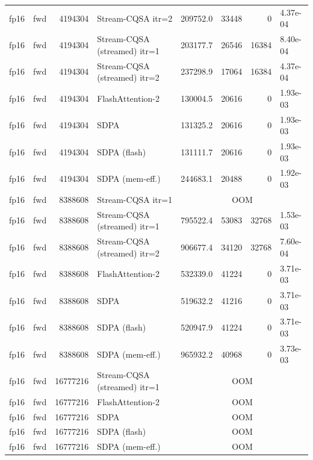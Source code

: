 \begin{tabular}{llrlrrrl}
fp16 & fwd & 4194304 & Stream-CQSA itr=2 & 209752.0 & 33448 & 0 & 4.37e-04 \\
fp16 & fwd & 4194304 & Stream-CQSA (streamed) itr=1 & 203177.7 & 26546 & 16384 & 8.40e-04 \\
fp16 & fwd & 4194304 & Stream-CQSA (streamed) itr=2 & 237298.9 & 17064 & 16384 & 4.37e-04 \\
fp16 & fwd & 4194304 & FlashAttention-2 & 130004.5 & 20616 & 0 & 1.93e-03 \\
fp16 & fwd & 4194304 & SDPA & 131325.2 & 20616 & 0 & 1.93e-03 \\
fp16 & fwd & 4194304 & SDPA (flash) & 131111.7 & 20616 & 0 & 1.93e-03 \\
fp16 & fwd & 4194304 & SDPA (mem-eff.) & 244683.1 & 20488 & 0 & 1.92e-03 \\
fp16 & fwd & 8388608 & Stream-CQSA itr=1 & \multicolumn{4}{c}{OOM} \\
fp16 & fwd & 8388608 & Stream-CQSA (streamed) itr=1 & 795522.4 & 53083 & 32768 & 1.53e-03 \\
fp16 & fwd & 8388608 & Stream-CQSA (streamed) itr=2 & 906677.4 & 34120 & 32768 & 7.60e-04 \\
fp16 & fwd & 8388608 & FlashAttention-2 & 532339.0 & 41224 & 0 & 3.71e-03 \\
fp16 & fwd & 8388608 & SDPA & 519632.2 & 41216 & 0 & 3.71e-03 \\
fp16 & fwd & 8388608 & SDPA (flash) & 520947.9 & 41224 & 0 & 3.71e-03 \\
fp16 & fwd & 8388608 & SDPA (mem-eff.) & 965932.2 & 40968 & 0 & 3.73e-03 \\
fp16 & fwd & 16777216 & Stream-CQSA (streamed) itr=1 & \multicolumn{4}{c}{OOM} \\
fp16 & fwd & 16777216 & FlashAttention-2 & \multicolumn{4}{c}{OOM} \\
fp16 & fwd & 16777216 & SDPA & \multicolumn{4}{c}{OOM} \\
fp16 & fwd & 16777216 & SDPA (flash) & \multicolumn{4}{c}{OOM} \\
fp16 & fwd & 16777216 & SDPA (mem-eff.) & \multicolumn{4}{c}{OOM} \\
\bottomrule
\end{tabular}
